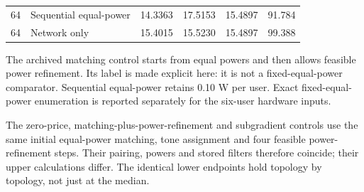 \documentclass[10pt,letterpaper]{article}
\begin{document}
\begin{table}[p]
\begin{tabular}{llllll}
64 & Sequential equal-power & 14.3363 & 17.5153 & 15.4897 & 91.784\\
64 & Network only & 15.4015 & 15.5230 & 15.4897 & 99.388\\
\bottomrule\end{tabular}
\par\medskip\begin{minipage}{\linewidth}\small
The archived matching control starts from equal powers and then allows feasible power refinement. Its label is made explicit here: it is not a fixed-equal-power comparator. Sequential equal-power retains 0.10 W per user. Exact fixed-equal-power enumeration is reported separately for the six-user hardware inputs.

The zero-price, matching-plus-power-refinement and subgradient controls use the same initial equal-power matching, tone assignment and four feasible power-refinement steps. Their pairing, powers and stored filters therefore coincide; their upper calculations differ. The identical lower endpoints hold topology by topology, not just at the median.
\end{minipage}\end{table}
\end{document}
